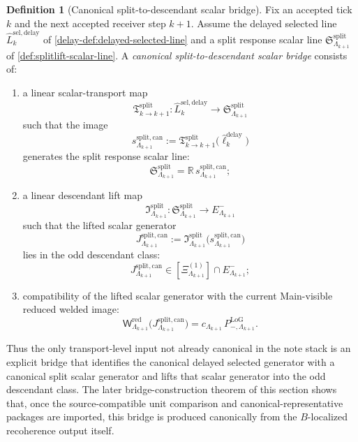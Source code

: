 \documentclass[11pt]{article}
\theoremstyle{definition}
\newtheorem{definition}{Definition}[section]
\theoremstyle{plain}
\theoremstyle{remark}
\newcommand{\1}{\mathbf 1}
\begin{document}
\begin{definition}[Canonical split-to-descendant scalar bridge]
\label{def:splitlift-canonical-bridge}
Fix an accepted tick \(k\) and the next accepted receiver step \(k+1\).
Assume the delayed selected line
\(
\widehat L^{\mathrm{sel,delay}}_k
\)
of \cref{delay-def:delayed-selected-line} and a split response scalar line
\(
\mathfrak S^{\mathrm{split}}_{\Lambda_{k+1}}
\)
of \cref{def:splitlift-scalar-line}.
A \emph{canonical split-to-descendant scalar bridge} consists of:
\begin{enumerate}[leftmargin=2em,label=(\alph*)]
\item a linear scalar-transport map
  \[
  \mathfrak T^{\mathrm{split}}_{k\to k+1}:
  \widehat L^{\mathrm{sel,delay}}_k
  \longrightarrow
  \mathfrak S^{\mathrm{split}}_{\Lambda_{k+1}}
  \]
  such that the image
  \[
  s^{\mathrm{split,can}}_{\Lambda_{k+1}}
  :=
  \mathfrak T^{\mathrm{split}}_{k\to k+1}
  \bigl(\widehat\ell^{\mathrm{delay}}_k\bigr)
  \]
  generates the split response scalar line:
  \[
  \mathfrak S^{\mathrm{split}}_{\Lambda_{k+1}}
  =
  \mathbb R\,s^{\mathrm{split,can}}_{\Lambda_{k+1}};
  \]
\item a linear descendant lift map
  \[
  \mathfrak I^{\mathrm{split}}_{\Lambda_{k+1}}:
  \mathfrak S^{\mathrm{split}}_{\Lambda_{k+1}}
  \longrightarrow
  E^-_{\Lambda_{k+1}}
  \]
  such that the lifted scalar generator
  \[
  J^{\mathrm{split,can}}_{\Lambda_{k+1}}
  :=
  \mathfrak I^{\mathrm{split}}_{\Lambda_{k+1}}
  \bigl(
  s^{\mathrm{split,can}}_{\Lambda_{k+1}}
  \bigr)
  \]
  lies in the odd descendant class:
  \[
  J^{\mathrm{split,can}}_{\Lambda_{k+1}}
  \in
  [\Xi^{(1)}_{\Lambda_{k+1}}]\cap E^-_{\Lambda_{k+1}};
  \]
\item compatibility of the lifted scalar generator with the current Main-visible reduced welded
  image:
  \[
  \mathsf W^{\mathrm{red}}_{\Lambda_{k+1}}
  \!\bigl(
  J^{\mathrm{split,can}}_{\Lambda_{k+1}}
  \bigr)
  =
  c_{\Lambda_{k+1}}\,
  P^{\mathrm{LoG}}_{-,\Lambda_{k+1}}.
  \]
\end{enumerate}
Thus the only transport-level input not already canonical in the note stack is an explicit bridge
that identifies the canonical delayed selected generator with a canonical split scalar generator and
lifts that scalar generator into the odd descendant class.
The later bridge-construction theorem of this section shows that, once the source-compatible unit
comparison and canonical-representative packages are imported, this bridge is produced canonically
from the \(B\)-localized recoherence output itself.
\end{definition}
\end{document}
